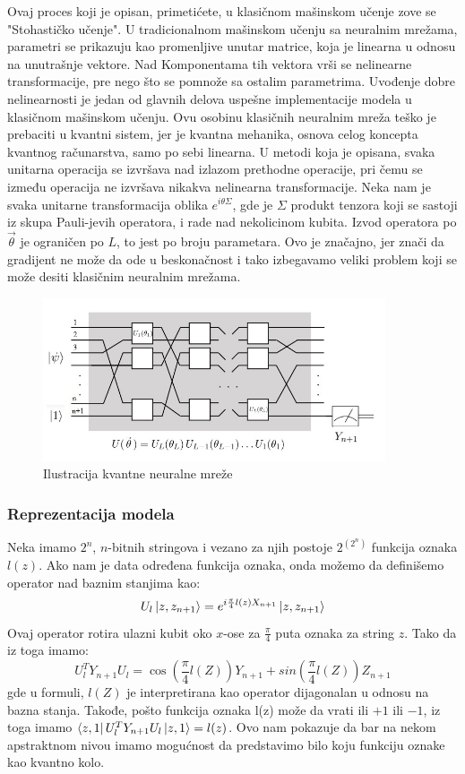 \documentclass[12pt, letterpaper, oneside]{article}
\begin{document}
Ovaj proces koji je opisan, primetićete, u klasičnom mašinskom učenje zove se "Stohastičko učenje".
U tradicionalnom mašinskom učenju sa neuralnim mrežama, parametri se prikazuju kao promenljive unutar matrice, koja je linearna u odnosu na unutrašnje vektore.
Nad Komponentama tih vektora vrši se nelinearne transformacije, pre nego što se pomnože sa ostalim parametrima. 
Uvođenje dobre nelinearnosti je jedan od glavnih delova uspešne implementacije modela u klasičnom mašinskom učenju.
Ovu osobinu klasičnih neuralnim mreža teško je prebaciti u kvantni sistem, jer je kvantna mehanika, osnova celog koncepta kvantnog računarstva, samo po sebi linearna.
U metodi koja je opisana, svaka unitarna operacija se izvršava nad izlazom prethodne operacije, pri čemu se između operacija ne izvršava nikakva nelinearna transformacije.
Neka nam je svaka unitarne transformacija oblika $e^{i\theta\Sigma}$, gde je $\Sigma$ produkt tenzora koji se sastoji iz skupa Pauli-jevih operatora, i rade nad nekolicinom kubita.
Izvod operatora po $\overrightarrow{\theta}$ je ograničen po $L$, to jest po broju parametara. Ovo je značajno, jer znači da gradijent ne može da ode u beskonačnost i tako izbegavamo 
veliki problem koji se može desiti klasičnim neuralnim mrežama.

\begin{figure}[ht]
    \centering
    \includegraphics[width=0.9\textwidth]{files/QNN.jpg}
    \caption{Ilustracija kvantne neuralne mreže \cite{Classification_wit_QNN}}
\end{figure}

\subsubsection{Reprezentacija modela}
Neka imamo $2^n$, $n$-bitnih stringova i vezano za njih postoje $2^{(2^n)}$ funkcija oznaka $l(z)$.
Ako nam je data određena funkcija oznaka, onda možemo da definišemo operator nad baznim stanjima kao:
\[
    U_l\Ket{z,z_{n+1}} = e^{i\frac{\pi}{4}l(z)X_{n+1}}\Ket{z,z_{n+1}}
\]
Ovaj operator rotira ulazni kubit oko $x$-ose za $\frac{\pi}{4}$ puta oznaka za string $z$.
Tako da iz toga imamo:
\[
    U_l^TY_{n+1}U_l = \cos(\frac{\pi}{4}l(Z))Y_{n+1} + sin(\frac{\pi}{4}l(Z))Z_{n+1}
\]
gde u formuli, $l(Z)$ je interpretirana kao operator dijagonalan u odnosu na bazna stanja.
Takođe, pošto funkcija oznaka l(z) može da vrati ili $+1$ ili $-1$, iz toga imamo $\bra{z,1}U_l^TY_{n+1}U_l\ket{z,1} = l(z)$.
Ovo nam pokazuje da bar na nekom apstraktnom nivou imamo mogućnost da predstavimo bilo koju funkciju oznake kao kvantno kolo.
\end{document}
